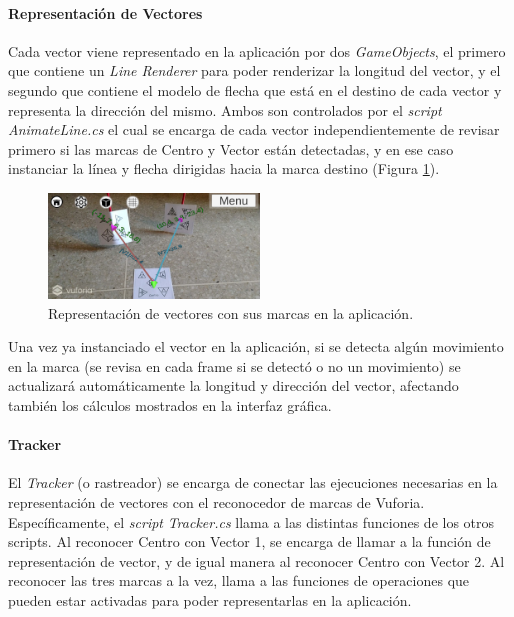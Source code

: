 \paragraph{Representación de Vectores}
Cada vector viene representado en la aplicación por dos \textit{GameObjects}, el primero que contiene un \textit{Line Renderer} para poder renderizar la longitud del vector, y el segundo que contiene el modelo de flecha que está en el destino de cada vector y representa la dirección del mismo. Ambos son controlados por el \textit{script} \textit{AnimateLine.cs} el cual se encarga de cada vector independientemente de revisar primero si las marcas de Centro y Vector están detectadas, y en ese caso instanciar la línea y flecha dirigidas hacia la marca destino (Figura \ref{fig:vec_representacion}).

\begin{figure}[hbt!]
\centering
\includegraphics[width=0.5\textwidth]{figuras/vectores/RepresentacionVectores.png}
\caption{\label{fig:vec_representacion}Representación de vectores con sus marcas en la aplicación.}
\end{figure}

Una vez ya instanciado el vector en la aplicación, si se detecta algún movimiento en la marca (se revisa en cada frame si se detectó o no un movimiento) se actualizará automáticamente la longitud y dirección del vector, afectando también los cálculos mostrados en la interfaz gráfica.
\FloatBarrier

\paragraph{Tracker}
El \textit{Tracker} (o rastreador) se encarga de conectar las ejecuciones necesarias en la representación de vectores con el reconocedor de marcas de Vuforia. Específicamente, el \textit{script} \textit{Tracker.cs} llama a las distintas funciones de los otros scripts. Al reconocer Centro con Vector 1, se encarga de llamar a la función de representación de vector, y de igual manera al reconocer Centro con Vector 2. Al reconocer las tres marcas a la vez, llama a las funciones de operaciones que pueden estar activadas para poder representarlas en la aplicación.

